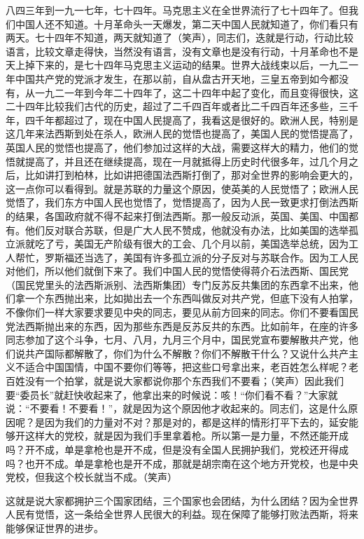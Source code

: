 八四三年到一九一七年，七十四年。马克思主义在全世界流行了七十四年了。但我们中国人还不知道。十月革命头一天爆发，第二天中国人民就知道了，你们看只有两天。七十四年不知道，两天就知道了（笑声），同志们，迭就是行动，行动比较语言，比较文章走得快，当然没有语言，没有文章也是没有行动，十月革命也不是天上掉下来的，是七十四年马克思主义运动的结果。世界大战线束以后，一九二一年中国共产党的党派才发生，在那以前，自从盘古开天地，三皇五帝到如今都没有，从一九二一年到今年二十四年了，这二十四年中起了变化，而且变得很快，这二十四年比较我们古代的历史，超过了二千四百年或者比二千四百年还多些，三千年，四千年都超过了，现在中国人民提高了，我看这是很好的。欧洲人民，特别是这几年来法西斯到处在杀人，欧洲人民的觉悟也提高了，美国人民的觉悟提高了，英国人民的觉悟也提高了，他们参加过这样的大战，需要这样大的精力，他们的觉悟就提高了，并且还在继续提高，现在一月就抵得上历史时代很多年，过几个月之后，比如讲打到柏林，比如讲把德国法西斯打倒了，那对全世界的影响会更大的，这一点你可以看得到。就是苏联的力量这个原因，使英美的人民觉悟了；欧洲人民觉悟了，我们东方中国人民也觉悟了，觉悟提高了，因为人民一致更求打倒法西斯的结果，各国政府就不得不起来打倒法西斯。那一般反动派，英国、美国、中国都有。他们反对联合苏联，但是广大人民不赞成，他就没有办法，比如美国的选举孤立派就吃了亏，美国无产阶级有很大的工会、几个月以前，美国选举总统，因为工人帮忙，罗斯福还当选了，美国有许多孤立派的分子反对与苏联合作。因为工人民对他们，所以他们就倒下来了。我们中国人民的觉悟使得蒋介石法西斯、国民党（国民党里头的法西斯派别、法西斯集团）专门反苏反共集团的东西拿不出来，他们拿一个东西抛出来，比如拋出去一个东西叫做反对共产党，但底下没有人拍掌，不像你们一样大家要求要见中央的同志，要见从前方回来的同志。你们不要看国民党法西斯抛出来的东西，因为那些东西是反苏反共的东西。比如前年，在座的许多同志参加了这个斗争，七月、八月，九月三个月中，国民党宣布要解散共产党，他们说共产国际都解散了，你们为什么不解散？你们不解散干什么？又说什么共产主义不适合中国国情，中国不要你们等等，把这些口号拿出来，老百姓怎么样呢？老百姓没有一个拍掌，就是说大家都说你那个东西我们不要看；（笑声）因此我们要“委员长”就赶快收起来了，他拿出来的时候说：咳！“你们看不看？”大家就说：“不要看！不要看！”，就是因为这个原因他才收起来的。同志们，这是什么原因呢？是因为我们的力量对不对？那是对的，都是这样的情形打平下去的，延安能够开这样大的党校，就是因为我们手里拿着枪。所以第一是力量，不然还能开成吗？开不成，单是拿枪也是开不成，但是没有全国人民拥护我们，党校还开得成吗？也开不成。单是拿枪也是开不成，那就是胡宗南在这个地方开党校，也是中央党校，但我这个校长就当不成。（笑声）

这就是说大家都拥护三个国家团结，三个国家也会团结，为什么团结？因为全世界人民有觉悟，这一条给全世界人民很大的利益。现在保障了能够打败法西斯，将来能够保证世界的进步。

